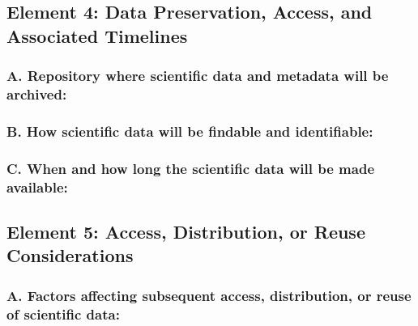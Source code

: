 \documentclass[../main.tex]{subfiles}
\begin{document}
\subsection*{Element 4: Data Preservation, Access, and Associated Timelines}

\subsubsection*{A. Repository where scientific data and metadata will be archived:}
\lipsum[1-3]

\subsubsection*{B. How scientific data will be findable and identifiable:}
\lipsum[1-3]

\subsubsection*{C. When and how long the scientific data will be made available:}
\lipsum[1-3]

\subsection*{Element 5: Access, Distribution, or Reuse Considerations}

\subsubsection*{A. Factors affecting subsequent access, distribution, or reuse of scientific data:}
\lipsum[1-3]
\end{document}
